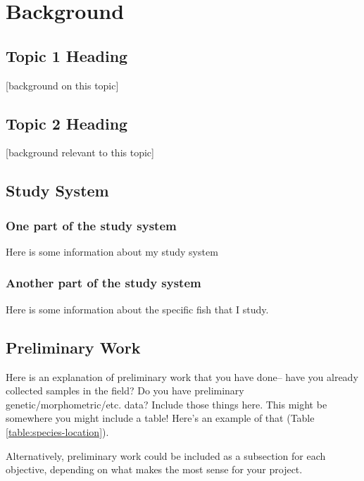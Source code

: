\section{Background}

\subsection{Topic 1 Heading}
[background on this topic]

\subsection{Topic 2 Heading}
[background relevant to this topic]

\subsection{Study System}

\subsubsection{One part of the study system}
Here is some information about my study system

\subsubsection{Another part of the study system}

Here is some information about the specific fish that I study.

\subsection{Preliminary Work}

Here is an explanation of preliminary work that you have done-- have you already collected samples in the field? Do you have preliminary genetic/morphometric/etc. data? Include those things here. This might be somewhere you might include a table! Here's an example of that (Table \ref{table:species-location}).

Alternatively, preliminary work could be included as a subsection for each objective, depending on what makes the most sense for your project.

